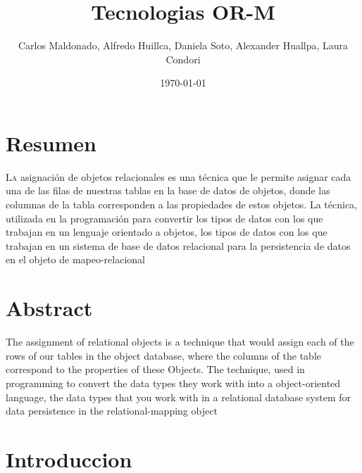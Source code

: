 \documentclass[twoside,twocolumn]{article}
\title{Tecnologias OR-M} %
\author{Carlos Maldonado, Alfredo Huillca, Daniela Soto, Alexander Huallpa, Laura Condori}
\date{\today} %
\begin{document}
\maketitle


\section{Resumen}

\lettrine[nindent=0em,lines=3]{L}a asignación de objetos relacionales es una técnica que le permite asignar cada una de las filas de nuestras
tablas en la base de datos de objetos, donde las columnas de la tabla corresponden a las propiedades de estos
objetos. La técnica, utilizada en la programación para convertir los tipos de datos con los que trabajan en un
lenguaje orientado a objetos, los tipos de datos con los que trabajan en un sistema de base de datos relacional
para la persistencia de datos en el objeto de mapeo-relacional




\section{Abstract}


The assignment of relational objects is a technique that would assign each of the rows of our
tables in the object database, where the columns of the table correspond to the properties of these
Objects. The technique, used in programming to convert the data types they work with into a
object-oriented language, the data types that you work with in a relational database system
for data persistence in the relational-mapping object




\section{Introduccion}
\end{document}
